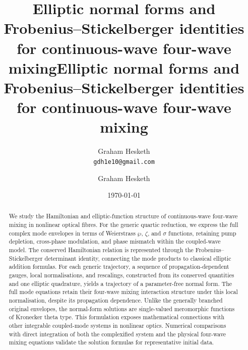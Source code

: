 \documentclass[11pt,a4paper]{article}
\numberwithin{equation}{section}
\begin{document}
\ifpreprint
  \title{Elliptic normal forms and Frobenius--Stickelberger identities for continuous-wave four-wave mixing}
  \author{Graham Hesketh \\
  \small \texttt{gdh1e10@gmail.com}}
  \date{\today}
  \maketitle
\else
  \title{Elliptic normal forms and Frobenius--Stickelberger identities for continuous-wave four-wave mixing}

  \author{Graham Hesketh}


\fi


\begin{abstract}
We study the Hamiltonian and elliptic-function structure of continuous-wave four-wave mixing in nonlinear optical fibres.
For the generic quartic reduction, we express the full complex mode envelopes in terms of Weierstrass $\wp$, $\zeta$, and $\sigma$ functions, retaining pump depletion, cross-phase modulation, and phase mismatch within the coupled-wave model.
The conserved Hamiltonian relation is represented through the Frobenius--Stickelberger determinant identity, connecting the mode products to classical elliptic addition formulas.
For each generic trajectory, a sequence of propagation-dependent gauges, local normalisations, and rescalings, constructed from its conserved quantities and one elliptic quadrature, yields a trajectory of a parameter-free normal form.
The full mode equations retain their four-wave mixing interaction structure under this local normalisation, despite its propagation dependence.
Unlike the generally branched original envelopes, the normal-form solutions are single-valued meromorphic functions of Kronecker theta type.
This formulation exposes mathematical connections with other integrable coupled-mode systems in nonlinear optics.
Numerical comparisons with direct integration of both the complexified system and the physical four-wave mixing equations validate the solution formulas for representative initial data.
\end{abstract}


\end{document}
